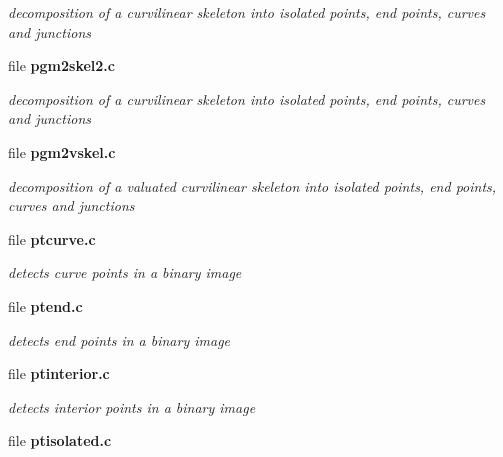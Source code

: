 \begin{DoxyCompactItemize}
\begin{DoxyCompactList}\small\item\em decomposition of a curvilinear skeleton into isolated points, end points, curves and junctions \item\end{DoxyCompactList}

\item 
file {\bf pgm2skel2.c}


\begin{DoxyCompactList}\small\item\em decomposition of a curvilinear skeleton into isolated points, end points, curves and junctions \item\end{DoxyCompactList}

\item 
file {\bf pgm2vskel.c}


\begin{DoxyCompactList}\small\item\em decomposition of a valuated curvilinear skeleton into isolated points, end points, curves and junctions \item\end{DoxyCompactList}

\item 
file {\bf ptcurve.c}


\begin{DoxyCompactList}\small\item\em detects curve points in a binary image \item\end{DoxyCompactList}

\item 
file {\bf ptend.c}


\begin{DoxyCompactList}\small\item\em detects end points in a binary image \item\end{DoxyCompactList}

\item 
file {\bf ptinterior.c}


\begin{DoxyCompactList}\small\item\em detects interior points in a binary image \item\end{DoxyCompactList}

\item 
file {\bf ptisolated.c}



\end{DoxyCompactItemize}
